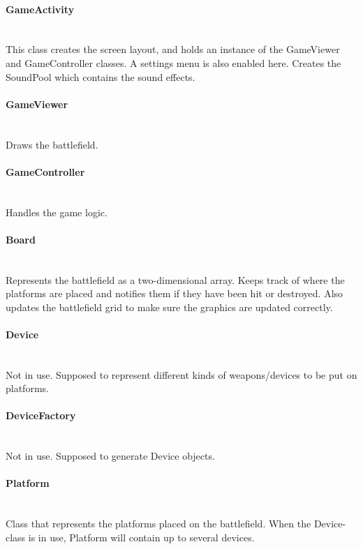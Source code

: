 \documentclass[12pt, a4paper]{article}
\begin{document}
\paragraph{GameActivity} ~\\
	This class creates the screen layout, and holds an instance of the GameViewer and GameController classes. A settings menu is also enabled here. Creates the SoundPool which contains the sound effects.

\paragraph{GameViewer} ~\\
	Draws the battlefield.

\paragraph{GameController} ~\\
	Handles the game logic.

\paragraph{Board} ~\\
	Represents the battlefield as a two-dimensional array. Keeps track of where the platforms are placed and notifies them if they have been hit or destroyed. Also updates the battlefield grid to make sure the graphics are updated correctly.

\paragraph{Device} ~\\
	 Not in use. Supposed to represent different kinds of weapons/devices to be put on platforms.

\paragraph{DeviceFactory} ~\\
	Not in use. Supposed to generate Device objects.

\paragraph{Platform}~\\
	Class that represents the platforms placed on the battlefield. When the Device-class is in use, Platform will contain up to several devices.
\end{document}

